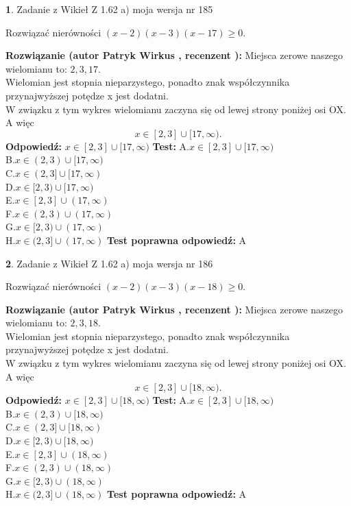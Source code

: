 \documentclass[12pt, a4paper]{article}
\theoremstyle{definition} %
\newtheorem{zad}{}
\newcommand{\zadStart}[1]{\begin{zad}#1\newline}
\newcommand{\zadStop}{\end{zad}}
\newcommand{\rozwStart}[2]{\noindent \textbf{Rozwiązanie (autor #1 , recenzent #2): }\newline}
\newcommand{\rozwStop}{\newline}
\newcommand{\odpStart}{\noindent \textbf{Odpowiedź:}\newline}
\newcommand{\odpStop}{\newline}
\newcommand{\testStart}{\noindent \textbf{Test:}\newline}
\newcommand{\testStop}{\newline}
\newcommand{\kluczStart}{\noindent \textbf{Test poprawna odpowiedź:}\newline}
\newcommand{\kluczStop}{\newline}
\begin{document}
\zadStart{Zadanie z Wikieł Z 1.62 a) moja wersja nr 185}

Rozwiązać nierówności $(x-2)(x-3)(x-17)\ge0$.
\zadStop
\rozwStart{Patryk Wirkus}{}
Miejsca zerowe naszego wielomianu to: $2, 3, 17$.\\
Wielomian jest stopnia nieparzystego, ponadto znak współczynnika przy\linebreak najwyższej potędze x jest dodatni.\\ W związku z tym wykres wielomianu zaczyna się od lewej strony poniżej osi OX. A więc $$x \in [2,3] \cup [17,\infty).$$
\rozwStop
\odpStart
$x \in [2,3] \cup [17,\infty)$
\odpStop
\testStart
A.$x \in [2,3] \cup [17,\infty)$\\
B.$x \in (2,3) \cup [17,\infty)$\\
C.$x \in (2,3] \cup [17,\infty)$\\
D.$x \in [2,3) \cup [17,\infty)$\\
E.$x \in [2,3] \cup (17,\infty)$\\
F.$x \in (2,3) \cup (17,\infty)$\\
G.$x \in [2,3) \cup (17,\infty)$\\
H.$x \in (2,3] \cup (17,\infty)$
\testStop
\kluczStart
A
\kluczStop



\zadStart{Zadanie z Wikieł Z 1.62 a) moja wersja nr 186}

Rozwiązać nierówności $(x-2)(x-3)(x-18)\ge0$.
\zadStop
\rozwStart{Patryk Wirkus}{}
Miejsca zerowe naszego wielomianu to: $2, 3, 18$.\\
Wielomian jest stopnia nieparzystego, ponadto znak współczynnika przy\linebreak najwyższej potędze x jest dodatni.\\ W związku z tym wykres wielomianu zaczyna się od lewej strony poniżej osi OX. A więc $$x \in [2,3] \cup [18,\infty).$$
\rozwStop
\odpStart
$x \in [2,3] \cup [18,\infty)$
\odpStop
\testStart
A.$x \in [2,3] \cup [18,\infty)$\\
B.$x \in (2,3) \cup [18,\infty)$\\
C.$x \in (2,3] \cup [18,\infty)$\\
D.$x \in [2,3) \cup [18,\infty)$\\
E.$x \in [2,3] \cup (18,\infty)$\\
F.$x \in (2,3) \cup (18,\infty)$\\
G.$x \in [2,3) \cup (18,\infty)$\\
H.$x \in (2,3] \cup (18,\infty)$
\testStop
\kluczStart
A
\kluczStop
\end{document}
